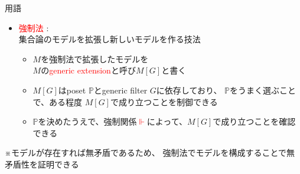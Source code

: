 \documentclass[17pt]{beamer}
\newcommand{\Pbb}{\mathbb{P}}
\begin{document}
\begin{frame}{用語}\,
    \vspace{-45pt}
    
    {\small 
    \begin{itemize}[itemsep=8pt]
        \item \textcolor{red}{強制法} : \\
        集合論のモデルを拡張し新しいモデルを作る技法
        \begin{itemize}
            \item $M$を強制法で拡張したモデルを\\$M$の\textcolor{red}{generic extension}と呼び$M[G]$と書く
            \item $M[G]$はposet $\Pbb$とgeneric filter $G$に依存しており、
            $\Pbb$をうまく選ぶことで、ある程度
            $M[G]$で成り立つことを制御できる
            \item $\Pbb$を決めたうえで、強制関係\textcolor{red}{$\Vdash$}によって、$M[G]$で成り立つことを確認できる
        \end{itemize}
    \end{itemize}
    \vspace{-15pt}
    ※モデルが存在すれば無矛盾であるため、
    強制法でモデルを構成することで無矛盾性を証明できる
}
\end{frame}
\end{document}
